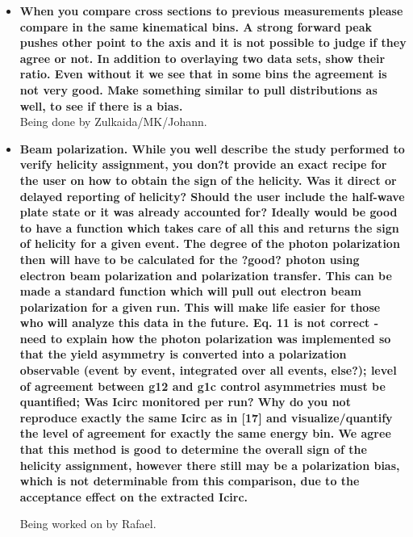 \documentclass[ 12 pt]{article}
\begin{document}
\begin{itemize}
\item \textbf{When you compare cross sections to previous measurements please 
compare in the same kinematical bins. A strong forward peak pushes other 
point to the axis and it is not possible to judge if they agree or not. In addition 
to overlaying two data sets, show their ratio. Even without it we see that in 
some bins the agreement is not very good. Make something similar to pull 
distributions as well, to see if there is a bias.}\\

Being done by Zulkaida/MK/Johann.


\item \textbf{Beam polarization. While you well describe the study performed to verify
helicity assignment, you don?t provide an exact recipe for the user on how to
obtain the sign of the helicity. Was it direct or delayed reporting of helicity?
Should the user include the half-wave plate state or it was already accounted
for? Ideally would be good to have a function which takes care of all this and
returns the sign of helicity for a given event. The degree of the photon
polarization then will have to be calculated for the ?good? photon using
electron beam polarization and polarization transfer. This can be made a
standard function which will pull out electron beam polarization for a given
run. This will make life easier for those who will analyze this data in the
future. Eq. 11 is not correct - need to explain how the photon polarization
was implemented so that the yield asymmetry is converted into a
polarization observable (event by event, integrated over all events, else?);
level of agreement between g12 and g1c control asymmetries must be
quantified; Was Icirc monitored per run? Why do you not reproduce exactly
the same Icirc as in [17] and visualize/quantify the level of agreement for
exactly the same energy bin. We agree that this method is good to determine
the overall sign of the helicity assignment, however there still may be a
polarization bias, which is not determinable from this comparison, due to the
acceptance effect on the extracted Icirc.}

Being worked on by Rafael.





\end{itemize}
\end{document}
